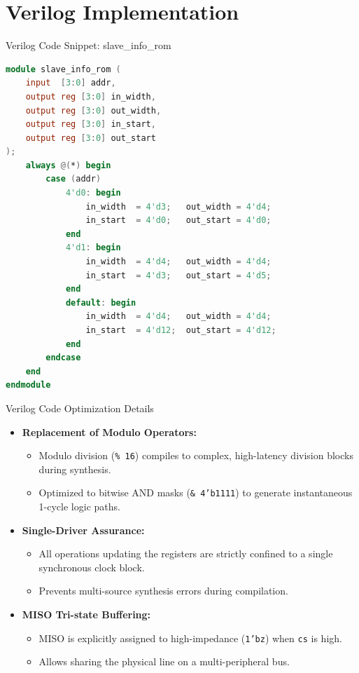 \documentclass{beamer}
\begin{document}
\section{Verilog Implementation}

\begin{frame}[fragile]{Verilog Code Snippet: slave\_info\_rom}
  \begin{lstlisting}[language=Verilog]
module slave_info_rom (
    input  [3:0] addr,
    output reg [3:0] in_width,
    output reg [3:0] out_width,
    output reg [3:0] in_start,
    output reg [3:0] out_start
);
    always @(*) begin
        case (addr)
            4'd0: begin
                in_width  = 4'd3;   out_width = 4'd4;
                in_start  = 4'd0;   out_start = 4'd0;
            end
            4'd1: begin
                in_width  = 4'd4;   out_width = 4'd4;
                in_start  = 4'd3;   out_start = 4'd5;
            end
            default: begin
                in_width  = 4'd4;   out_width = 4'd4;
                in_start  = 4'd12;  out_start = 4'd12;
            end
        endcase
    end
endmodule
  \end{lstlisting}
\end{frame}

\begin{frame}{Verilog Code Optimization Details}
  \begin{itemize}
    \item \textbf{Replacement of Modulo Operators:}
    \begin{itemize}
      \item Modulo division (\texttt{\% 16}) compiles to complex, high-latency division blocks during synthesis.
      \item Optimized to bitwise AND masks (\texttt{\& 4'b1111}) to generate instantaneous 1-cycle logic paths.
    \end{itemize}
    \item \textbf{Single-Driver Assurance:}
    \begin{itemize}
      \item All operations updating the registers are strictly confined to a single synchronous clock block.
      \item Prevents multi-source synthesis errors during compilation.
    \end{itemize}
    \item \textbf{MISO Tri-state Buffering:}
    \begin{itemize}
      \item MISO is explicitly assigned to high-impedance (\texttt{1'bz}) when \texttt{cs} is high.
      \item Allows sharing the physical line on a multi-peripheral bus.
    \end{itemize}
  \end{itemize}
\end{frame}
\end{document}
